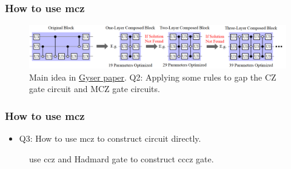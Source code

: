 \documentclass[18 pt]{beamer}
\begin{document}
\begin{frame}
    \frametitle{How to use mcz}
    \begin{figure}
        \includegraphics[width=\textwidth]{gyser.png}
        \caption{Main idea in \href{https://dl.acm.org/doi/10.1145/3470496.3527428}{Gyser paper}. Q2: Applying some rules to gap the CZ gate circuit and MCZ gate circuits.
        }
    \end{figure}
\end{frame}
\begin{frame}
    \frametitle{How to use mcz}
    \begin{itemize}
        \item Q3: How to use mcz to construct circuit directly.
    \end{itemize}
    \begin{figure}
            \caption{use ccz and Hadmard gate to construct cccz gate.}
        \end{figure}
\end{frame}
\end{document}
